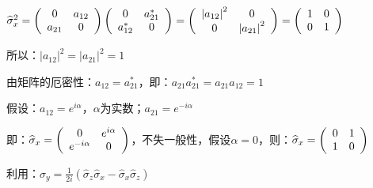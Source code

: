 $\widehat\sigma _x^2  = \left( {\begin{array}{*{20}c}
   0 & {a_{12} }  \\
   {a_{21} } & 0  \\
\end{array}} \right)\left( {\begin{array}{*{20}c}
   0 & {a_{21}^* }  \\
   {a_{12}^* } & 0  \\
\end{array}} \right) = \left( {\begin{array}{*{20}c}
   {\left| {a_{12} } \right|^2 } & 0  \\
   0 & {\left| {a_{21} } \right|^2 }  \\
\end{array}} \right) = \left( {\begin{array}{*{20}c}
   1 & 0  \\
   0 & 1  \\
\end{array}} \right)$

所以：$\left| {a_{12} } \right|^2  = \left| {a_{21} } \right|^2  = 1$



由矩阵的厄密性：$a_{12}  = a_{21}^* $，即：$a_{21} a_{21}^*  = a_{21} a_{12}  = 1$


假设：$a_{12}  = e^{i\alpha } $，$\alpha$为实数；$a_{21}  = e^{ - i\alpha } $


即：$\widehat\sigma _x  = \left( {\begin{array}{*{20}c}
   0 & {e^{i\alpha } }  \\
   {e^{ - i\alpha } } & 0  \\
\end{array}} \right)$，不失一般性，假设$\alpha = 0$，则：$\widehat\sigma _x  = \left( {\begin{array}{*{20}c}
   0 & 1  \\
   1 & 0  \\
\end{array}} \right)$


利用：$\widehat\sigma _y  = \frac{1}{{2i}}\left( {\widehat\sigma _z \widehat\sigma _x  - \widehat\sigma _x \widehat\sigma _z } \right)$

